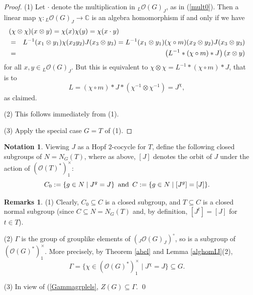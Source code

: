 \documentclass{amsart}
\numberwithin{equation}{section}
\theoremstyle{definition}
\newtheorem{remarks}[theorem]{Remarks}
\newtheorem{notation}[theorem]{Notation}
\begin{document}
\begin{proof} 
(1) Let $\cdot$ denote the multiplication in ${}_L\mathcal{O}(G)_J$, as in (\ref{mult0}). Then a linear map $\chi:{}_L\mathcal{O}(G)_J\to \mathbb{C}$ is an algebra homomorphism if and only if we have
\begin{eqnarray*}
\lefteqn{(\chi\otimes \chi)(x\otimes y)=\chi(x)\chi(y)=\chi(x\cdot y)}\\
& = & L^{-1}(x_1\otimes y_1)\chi(x_2y_2)J(x_3\otimes y_3)=L^{-1}(x_1\otimes y_1)(\chi\circ m)(x_2\otimes y_2)J(x_3\otimes y_3)\\
& = & \left(L^{-1}*(\chi\circ m)*J\right)(x\otimes y)
\end{eqnarray*}
for all $x,y \in {}_L\mathcal{O}(G)_J$. But this is equivalent to $\chi\otimes \chi=L^{-1}*(\chi\circ m)*J$, that is to 
$$L=(\chi\circ m)*J*(\chi^{-1}\otimes \chi^{-1})=J^{\chi},$$ as claimed.

(2) This follows immediately from (1).

(3) Apply the special case $G = T$ of (1). 
\end{proof}

\begin{notation}\label{groups} 
Viewing $J$ as a Hopf $2$-cocycle for $T$, define the following closed subgroups of $N = N_G(T)$, where as above, $[J]$ denotes the orbit of $J$ under the action of $(\mathcal{O}(T)^*)_1^{\times}$:
\begin{equation}\label{smallgroup}
C_0:=\{ g \in N \mid J^g = J \}\,\,\,{\rm and}\,\,\, 
C :=\{ g \in N \mid [J^g] = [J] \}.
\end{equation}
\end{notation}

\begin{remarks}\label{grouprems} 
(1) Clearly, $C_0 \subseteq C$ is a closed subgroup, and $T \subseteq C$ is a closed normal subgroup (since $C \subseteq N = N_G(T)$ and, by definition, $[J^t] = [J]$ for $t\in T$).

(2) $\Gamma$ is the group of grouplike elements of $\left({}_J\mathcal{O}(G)_J\right)^{\circ}$, so is a subgroup of $\left(\mathcal{O}(G)^*\right)_1^{\times}$. More precisely, by Theorem \ref{abel} and Lemma \ref{alghomIJ}(2),
\begin{equation}\label{Gammagrplels}
\Gamma =\{\chi\in (\mathcal{O}(G)^*)_1^{\times} \mid J^{\chi}=J\} \subseteq G.
\end{equation}

(3) In view of (\ref{Gammagrplels}, $Z(G) \subseteq \Gamma$. \qed
\end{remarks}
\end{document}
